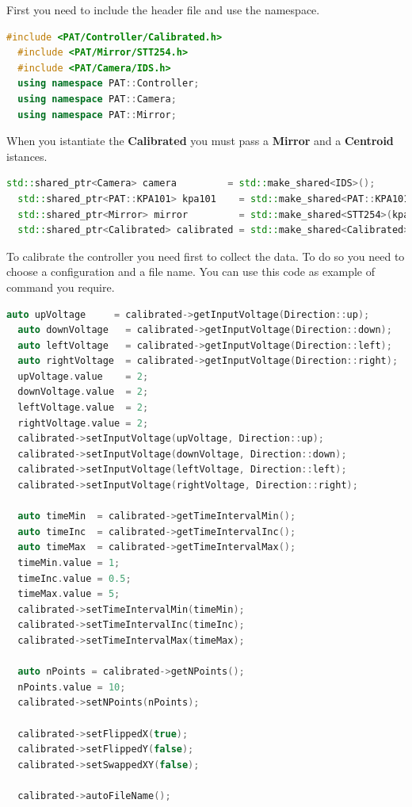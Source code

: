 First you need to include the header file and use the namespace.

\begin{lstlisting}[language=c++, gobble=2]
  #include <PAT/Controller/Calibrated.h>
  #include <PAT/Mirror/STT254.h>
  #include <PAT/Camera/IDS.h>
  using namespace PAT::Controller;
  using namespace PAT::Camera;
  using namespace PAT::Mirror;
\end{lstlisting}

When you istantiate the \textbf{Calibrated} you must pass a
\textbf{Mirror} and a \textbf{Centroid} istances.

\begin{lstlisting}[language=c++, gobble=2]
  std::shared_ptr<Camera> camera         = std::make_shared<IDS>();
  std::shared_ptr<PAT::KPA101> kpa101    = std::make_shared<PAT::KPA101>();
  std::shared_ptr<Mirror> mirror         = std::make_shared<STT254>(kpa101);
  std::shared_ptr<Calibrated> calibrated = std::make_shared<Calibrated>(mirror, camera->getFrame()->getCentroid(), camera->getFrame()->getTarget());
\end{lstlisting}

To calibrate the controller you need first to collect the data. To do so
you need to choose a configuration and a file name. You can use this
code as example of command you require.

\begin{lstlisting}[language=c++, gobble=2]
  auto upVoltage     = calibrated->getInputVoltage(Direction::up);
  auto downVoltage   = calibrated->getInputVoltage(Direction::down);
  auto leftVoltage   = calibrated->getInputVoltage(Direction::left);
  auto rightVoltage  = calibrated->getInputVoltage(Direction::right);
  upVoltage.value    = 2;
  downVoltage.value  = 2;
  leftVoltage.value  = 2;
  rightVoltage.value = 2;
  calibrated->setInputVoltage(upVoltage, Direction::up);
  calibrated->setInputVoltage(downVoltage, Direction::down);
  calibrated->setInputVoltage(leftVoltage, Direction::left);
  calibrated->setInputVoltage(rightVoltage, Direction::right);
  
  auto timeMin  = calibrated->getTimeIntervalMin();
  auto timeInc  = calibrated->getTimeIntervalInc();
  auto timeMax  = calibrated->getTimeIntervalMax();
  timeMin.value = 1;
  timeInc.value = 0.5;
  timeMax.value = 5;
  calibrated->setTimeIntervalMin(timeMin);
  calibrated->setTimeIntervalInc(timeInc);
  calibrated->setTimeIntervalMax(timeMax);
  
  auto nPoints = calibrated->getNPoints();
  nPoints.value = 10;
  calibrated->setNPoints(nPoints);
  
  calibrated->setFlippedX(true);
  calibrated->setFlippedY(false);
  calibrated->setSwappedXY(false);
  
  calibrated->autoFileName();
\end{lstlisting}

